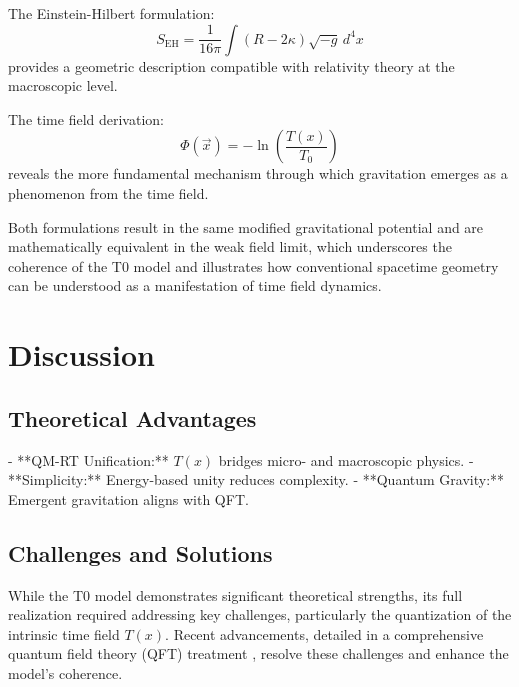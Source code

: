 \documentclass[twocolumn,aps,prl]{revtex4-2}
\newcommand{\Tfield}{T(x)}
\newcommand{\Tzero}{T_0}
\newcommand{\vecx}{\vec{x}}
\begin{document}
	The Einstein-Hilbert formulation:
	\begin{equation}
		S_{\text{EH}} = \frac{1}{16\pi} \int (R - 2\kappa) \sqrt{-g} \, d^4x
	\end{equation}
	provides a geometric description compatible with relativity theory at the macroscopic level.
	
	The time field derivation:
	\begin{equation}
		\Phi(\vecx) = -\ln\left(\frac{\Tfield}{\Tzero}\right)
	\end{equation}
	reveals the more fundamental mechanism through which gravitation emerges as a phenomenon from the time field.
	
	Both formulations result in the same modified gravitational potential and are mathematically equivalent in the weak field limit, which underscores the coherence of the T0 model and illustrates how conventional spacetime geometry can be understood as a manifestation of time field dynamics.
	\section{Discussion}
	\label{sec:discussion}
	
	\subsection{Theoretical Advantages}
	- **QM-RT Unification:** \(\Tfield\) bridges micro- and macroscopic physics.
	- **Simplicity:** Energy-based unity reduces complexity.
	- **Quantum Gravity:** Emergent gravitation aligns with QFT.
	
	\subsection{Challenges and Solutions}
	\label{subsec:challenges}
	
	While the T0 model demonstrates significant theoretical strengths, its full realization required addressing key challenges, particularly the quantization of the intrinsic time field \(\Tfield\). Recent advancements, detailed in a comprehensive quantum field theory (QFT) treatment \cite{pascher_qft_2025}, resolve these challenges and enhance the model’s coherence.
	
\end{document}
